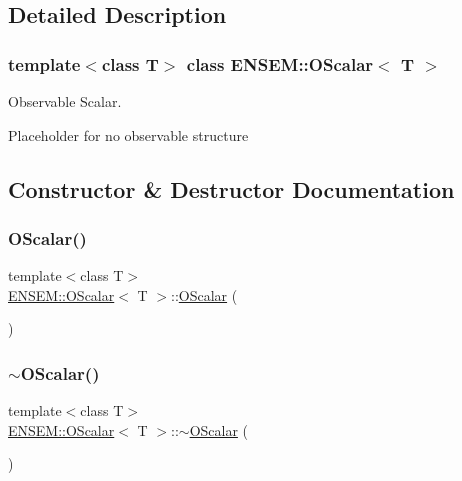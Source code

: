 \subsection{Detailed Description}
\subsubsection*{template$<$class T$>$\newline
class E\+N\+S\+E\+M\+::\+O\+Scalar$<$ T $>$}

Observable Scalar. 

Placeholder for no observable structure 

\subsection{Constructor \& Destructor Documentation}
\mbox{\label{classENSEM_1_1OScalar_abd51915d3c7af4b8ea33923eee128c2c}} 
\subsubsection{\texorpdfstring{OScalar()}{OScalar()}\hspace{0.1cm}{\footnotesize\ttfamily [1/18]}}
{\footnotesize\ttfamily template$<$class T$>$ \\
\mbox{\hyperlink{classENSEM_1_1OScalar}{E\+N\+S\+E\+M\+::\+O\+Scalar}}$<$ T $>$\+::\mbox{\hyperlink{classENSEM_1_1OScalar}{O\+Scalar}} (\begin{DoxyParamCaption}{ }\end{DoxyParamCaption})\hspace{0.3cm}{\ttfamily [inline]}}

\mbox{\label{classENSEM_1_1OScalar_ac08c93c225f24926096565485406c529}} 
\subsubsection{\texorpdfstring{$\sim$OScalar()}{~OScalar()}\hspace{0.1cm}{\footnotesize\ttfamily [1/3]}}
{\footnotesize\ttfamily template$<$class T$>$ \\
\mbox{\hyperlink{classENSEM_1_1OScalar}{E\+N\+S\+E\+M\+::\+O\+Scalar}}$<$ T $>$\+::$\sim$\mbox{\hyperlink{classENSEM_1_1OScalar}{O\+Scalar}} (\begin{DoxyParamCaption}{ }\end{DoxyParamCaption})\hspace{0.3cm}{\ttfamily [inline]}}

